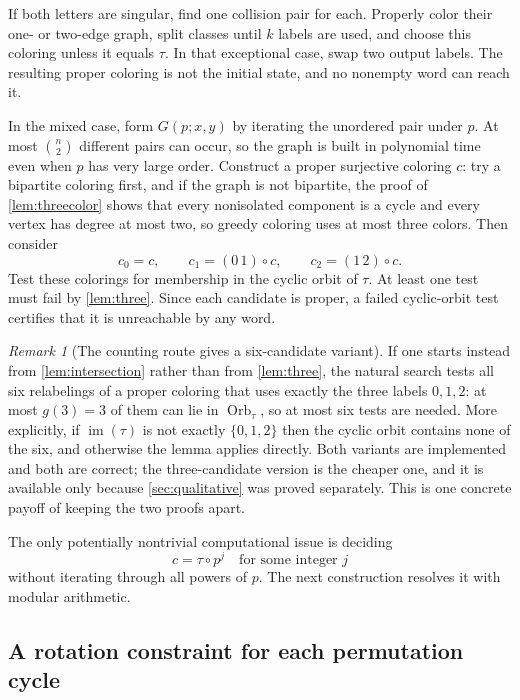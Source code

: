 \documentclass[11pt,a4paper]{article}
\numberwithin{equation}{section}
\theoremstyle{definition}
\theoremstyle{remark}
\newtheorem{remark}[theorem]{Remark}
\newcommand{\im}{\operatorname{im}}
\newcommand{\Orb}{\operatorname{Orb}}
\begin{document}
If both letters are singular, find one collision pair for each. Properly
color their one- or two-edge graph, split classes until $k$ labels are used,
and choose this coloring unless it equals $\tau$. In that exceptional case,
swap two output labels. The resulting proper coloring is not the initial
state, and no nonempty word can reach it.

In the mixed case, form $G(p;x,y)$ by iterating the unordered pair under $p$.
At most $\binom n2$ different pairs can occur, so the graph is built in
polynomial time even when $p$ has very large order. Construct a proper
surjective coloring $c$: try a bipartite coloring first, and if the graph is
not bipartite, the proof of \cref{lem:threecolor} shows that every nonisolated
component is a cycle and every vertex has degree at most two, so greedy
coloring uses at most three colors. Then consider
\[
 c_0=c,\qquad c_1=(0\,1)\circ c,\qquad c_2=(1\,2)\circ c.
\]
Test these colorings for membership in the cyclic orbit of $\tau$. At least
one test must fail by \cref{lem:three}. Since each candidate is proper, a
failed cyclic-orbit test certifies that it is unreachable by any word.

\begin{remark}[The counting route gives a six-candidate variant]
\label{rem:sixtests}
If one starts instead from \cref{lem:intersection} rather than from
\cref{lem:three}, the natural search tests all six relabelings of a proper
coloring that uses exactly the three labels $0,1,2$: at most $g(3)=3$ of them
can lie in $\Orb_\tau$, so at most six tests are needed. More explicitly, if
$\im(\tau)$ is not exactly $\{0,1,2\}$ then the cyclic orbit contains none of
the six, and otherwise the lemma applies directly. Both variants are
implemented and both are correct; the three-candidate version is the cheaper
one, and it is available only because \cref{sec:qualitative} was proved
separately. This is one concrete payoff of keeping the two proofs apart.
\end{remark}

The only potentially nontrivial computational issue is deciding
\begin{equation}\label{eq:orbitmembership}
 c=\tau\circ p^j\quad\text{for some integer }j
\end{equation}
without iterating through all powers of $p$. The next construction resolves
it with modular arithmetic.

\subsection{A rotation constraint for each permutation cycle}
\end{document}

